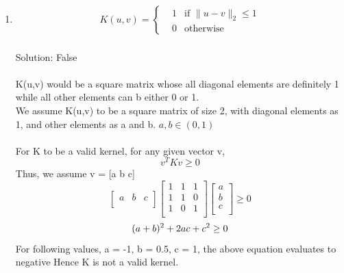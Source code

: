 \documentclass[twoside,11pt]{article}\usepackage{amsmath,amsfonts,amsthm,fullpage}
\begin{document}
\begin{enumerate}
\item \begin{align}
	K(u,v) = \left\{
	\begin{aligned}
	&1 & \text{if } \|u-v\|_2 \leqslant 1\\
	& 0 & \text{otherwise}
	\end{aligned}
	\right.
	\end{align}
	\\Solution: False
\\\\ K(u,v) would be a square matrix whose all diagonal elements are definitely 1 while all other elements can b either 0 or 1.
\\ We assume K(u,v) to be a square matrix of size 2, with diagonal elements as 1, and other elements as a and b. $ a, b \in (0,1) $
\\\\ For K to be a valid kernel, for any given vector v, 
\begin{equation} \nonumber
v^T K v \geq 0
\end{equation}
Thus, we assume v = [a   b   c]
\begin{equation} \nonumber
\begin{bmatrix}
a & b & c\\
\end{bmatrix}
\begin{bmatrix}
1 & 1 & 1 \\
1 & 1 & 0\\
1 & 0 & 1\\
\end{bmatrix}
\begin{bmatrix}
a \\
b \\
c \\
\end{bmatrix} \geq 0 
\end{equation}
\begin{equation} \nonumber
(a+b)^2 + 2ac + c^2 \geq 0  \\\\
\end{equation}
 For following values, a = -1, b = 0.5,  c = 1, the above equation evaluates to negative
Hence K is not a valid kernel.
\\\\
	


\end{enumerate}
\end{document}
